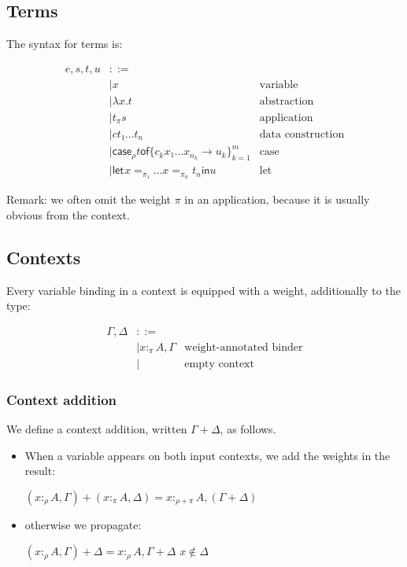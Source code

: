 \documentclass[11pt]{article}
\newcommand{\case}[3][]{\mathsf{case}_{#1} #2 \mathsf{of} \{#3\}^m_{k=1}}
\newcommand{\flet}[1][]{\mathsf{let}_{#1} }
\newcommand{\fin}{ \mathsf{in} }
\begin{document}
\subsection{Terms}
\label{sec:orgheadline3}

The syntax for terms is:

\begin{align*}
e,s,t,u & ::= \\
    & |  x & \text{variable} \\
    & |  λx. t & \text{abstraction} \\
    & |  t_π s & \text{application} \\
    & |  c t₁ … t_n & \text{data construction} \\
    & |  \case[ρ] t {c_k  x₁ … x_{n_k} → u_k}  & \text{case} \\
    & |  \flet x =_{π₁} … x =_{π_n} t_n \fin u & \text{let}
\end{align*}

Remark: we often omit the weight $π$ in an application, because it is
usually obvious from the context.

\subsection{Contexts}
\label{sec:orgheadline6}

Every variable binding in a context is equipped with a weight,
additionally to the type:

\begin{align*}
  Γ,Δ & ::=\\
    & |  x :_π A, Γ & \text{weight-annotated binder} \\
    & |     & \text {empty context}
\end{align*}

\subsubsection{Context addition}
\label{sec:orgheadline4}

We define a context addition, written \(Γ+Δ\), as follows.

\begin{itemize}
\item When a variable appears on both input contexts, we add the weights in
the result:

\((x :_ρ A,Γ) + (x :_π A,Δ) = x :_{ρ+π} A, (Γ+Δ)\)

\item otherwise we propagate:

\((x :_ρ A,Γ) + Δ = x :_ρ A, Γ+Δ\)   \hfill   \(x ∉ Δ\)
\end{itemize}
\end{document}
